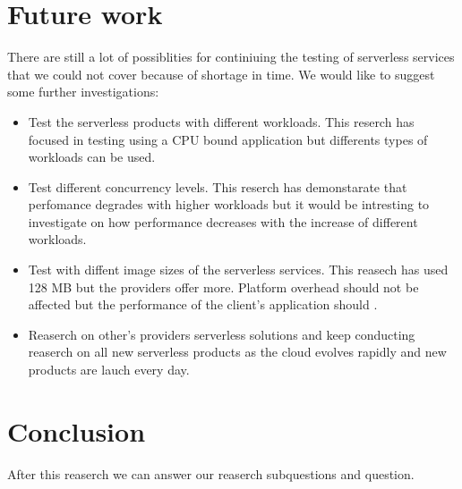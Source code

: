 \documentclass[11pt]{article}
\begin{document}
\section{Future work}

There are still a lot of possiblities for continiuing the testing of serverless services that we could not cover because of shortage in time. We would like to suggest some further investigations:

\begin{itemize}
\item Test the serverless products with different workloads. This reserch has focused in testing using a CPU bound application but differents types of workloads can be used.
\item Test different concurrency levels. This reserch has demonstarate that perfomance degrades with higher workloads but it would be intresting to investigate on how performance decreases with the increase of different workloads. 
\item Test with diffent image sizes of the serverless services. This reasech has used 128 MB but the providers offer more. Platform overhead should not be affected but the performance of the client's application should \cite{laltre}.
\item Reaserch on other's providers serverless solutions and keep conducting reaserch on all new serverless products as the cloud evolves rapidly and new products are lauch every day.

\end{itemize}



\section{Conclusion}

After this reaserch we can answer our reaserch subquestions and question.
\end{document}
